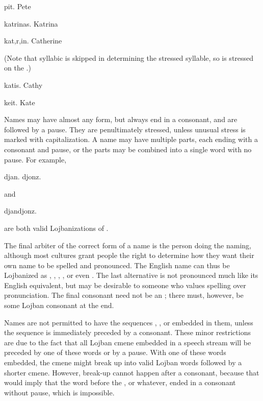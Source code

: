 \begin{example}
pit.\n
Pete
\end{example}

\begin{example}
katrinas.\n
Katrina
\end{example}

\begin{example}
kat,r,in.\n
Catherine
\end{example}

(Note that syllabic  is skipped in determining the stressed syllable, so  is stressed on the .)
\begin{example}
katis.\n
Cathy
\end{example}

\begin{example}
keit.\n
Kate
\end{example}

Names may have almost any form, but always end in a consonant, and are followed by a pause. They are penultimately stressed, unless unusual stress is marked with capitalization. A name may have multiple parts, each ending with a consonant and pause, or the parts may be combined into a single word with no pause. For example,
\begin{example}
djan.  djonz.
\end{example}

{\noindent}and
\begin{example}
djandjonz.
\end{example}

{\noindent}are both valid Lojbanizations of . 

The final arbiter of the correct form of a name is the person doing the naming, although most cultures grant people the right to determine how they want their own name to be spelled and pronounced. The English name  can thus be Lojbanized as , , , , or even . The last alternative is not pronounced much like its English equivalent, but may be desirable to someone who values spelling over pronunciation. The final consonant need not be an ; there must, however, be some Lojban consonant at the end.

Names are not permitted to have the sequences , , or  embedded in them, unless the sequence is immediately preceded by a consonant. These minor restrictions are due to the fact that all Lojban cmene embedded in a speech stream will be preceded by one of these words or by a pause. With one of these words embedded, the cmene might break up into valid Lojban words followed by a shorter cmene. However, break-up cannot happen after a consonant, because that would imply that the word before the , or whatever, ended in a consonant without pause, which is impossible.

